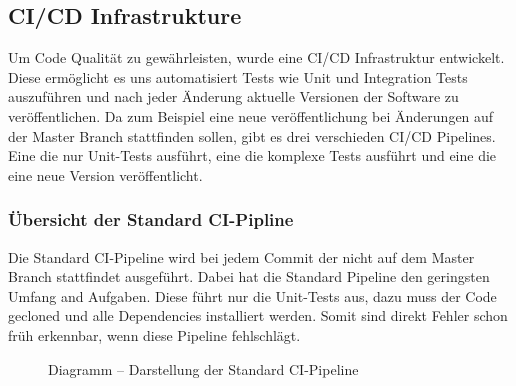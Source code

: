 \subsection{CI/CD Infrastrukture}
Um Code Qualität zu gewährleisten, wurde eine \ac{CI/CD} Infrastruktur entwickelt.
Diese ermöglicht es uns automatisiert Tests wie Unit und Integration Tests auszuführen und nach jeder Änderung aktuelle Versionen der Software zu veröffentlichen.
Da zum Beispiel eine neue veröffentlichung bei Änderungen auf der Master Branch stattfinden sollen, gibt es drei verschieden \ac{CI/CD} Pipelines.
Eine die nur Unit-Tests ausführt, eine die komplexe Tests ausführt und eine die eine neue Version veröffentlicht.

\subsubsection{Übersicht der Standard \ac{CI}-Pipline}
Die Standard \ac{CI}-Pipeline wird bei jedem Commit der nicht auf dem Master Branch stattfindet ausgeführt. Dabei hat die Standard Pipeline den geringsten Umfang and Aufgaben.
Diese führt nur die Unit-Tests aus, dazu muss der Code gecloned und alle Dependencies installiert werden. Somit sind direkt Fehler schon früh erkennbar, wenn diese Pipeline fehlschlägt.
\begin{figure}[!htbp]
    \centering    
    \usetikzlibrary{positioning}
\caption{Diagramm – Darstellung der Standard \ac{CI}-Pipeline}
\end{figure}


